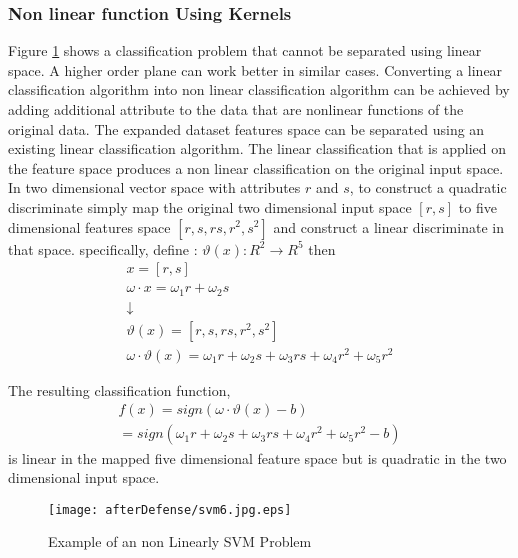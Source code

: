 \subsubsection {Non linear function Using Kernels}
Figure \ref{fig:svm6} shows a classification problem that cannot be separated using linear space. A higher order plane can work better in similar cases. Converting a linear classification algorithm into non linear classification algorithm can be achieved by adding additional attribute to the data that are nonlinear functions of the original data. The expanded dataset features space can be separated using an existing linear classification algorithm.  The linear classification that is applied on the feature space produces a non linear classification on the original input space. In two dimensional vector space with attributes $r$ and $s$, to construct a quadratic  discriminate  simply map the original two dimensional input space $\left[r,s\right]$ to  five dimensional features space $\left[r,s,rs,r^2,s^2\right]$ and construct a linear discriminate in that space. specifically, define : $\vartheta(x):R^2  \rightarrow R^5$ then 
\begin{equation}
\begin{array}{l}
	x=[r,s] \\
	\omega \cdot x=\omega_1 r+ \omega_2 s \\
	\downarrow \\
	\vartheta(x)=\left[r,s,rs,r^2,s^2\right] \\
	
	 \omega \cdot \vartheta(x)= \omega_1 r+ \omega_2 s + \omega_3 rs+ \omega_4 r^2+\omega_5 r^2 
\end{array}
\label{eq:kernel}
\end{equation}  

The resulting classification function, 
\begin{equation}
\begin{array}{l}
f(x)=sign\left( \omega \cdot\vartheta(x)-b \right) \\
= sign\left( \omega_1 r+ \omega_2 s + \omega_3 rs+ \omega_4 r^2+\omega_5 r^2 -b \right) 
\end{array}
\label{eq:kern2}
\end{equation}  
is linear in the mapped five dimensional feature space but is quadratic in the two dimensional input space. 

\begin{figure}
	\centering
		\texttt{[image: afterDefense/svm6.jpg.eps]}
	\caption{Example of an non Linearly SVM Problem }
	\label{fig:svm6}
\end{figure}

